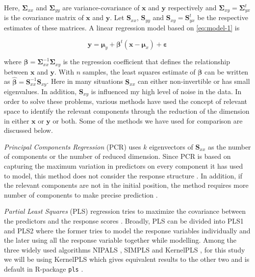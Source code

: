 \documentclass[12pt,3p,authoryear]{elsarticle}
\begin{document}
Here, \(\boldsymbol{\Sigma}_{xx}\) and \(\boldsymbol{\Sigma}_{yy}\) are variance-covariance of \(\mathbf{x}\) and \(\mathbf{y}\) respectively and \(\boldsymbol{\Sigma}_{xy}=\boldsymbol{\Sigma}_{yx}^t\) is the covariance matrix of \(\mathbf{x}\) and \(\mathbf{y}\). Let \(\mathbf{S}_{xx}\), \(\mathbf{S}_{yy}\) and \(\mathbf{S}_{xy}=\mathbf{S}_{yx}^t\) be the respective estimates of these matrices. A linear regression model based on \eqref{eq:model-1} is

\begin{equation}
\mathbf{y} = \boldsymbol{\mu}_y + \boldsymbol{\beta}^t\left( \mathbf{x} - \boldsymbol{\mu}_{x} \right) + \boldsymbol{\varepsilon}
\label{eq:reg-model}
\end{equation}

where \(\boldsymbol{\beta}=\boldsymbol{\Sigma}_{xx}^{-1}\boldsymbol{\Sigma}_{xy}\)
is the regression coefficient that defines the relationship between \(\mathbf{x}\)
and \(\mathbf{y}\). With \(n\) samples, the least squares estimate of \(\boldsymbol{\beta}\) can be written as \(\boldsymbol{\hat{\beta}}=\mathbf{S}_{xx}^{-1}\mathbf{S}_{xy}\). Here in many situations \(\mathbf{S}_{xx}\) can either non-invertible or has small eigenvalues. In addition, \(\mathbf{S}_{xy}\) is influenced my high level of noise in the data. In order to solve these problems, various methods have used the concept of relevant space to identify the relevant components through the reduction of the dimension in either \(\mathbf{x}\) or \(\mathbf{y}\) or both. Some of the methods we have used for comparison are discussed below.

\emph{Principal Components Regression} (PCR) uses \(k\) eigenvectors of \(\mathbf{S}_{xx}\) as the number of components or the number of reduced dimension. Since PCR is based on capturing the maximum variation in predictors on every component it has used to model, this method does not consider the response structure \citep{Jolliffe2002}. In addition, if the relevant components are not in the initial position, the method requires more number of components to make precise prediction \citep{Alm_y_1996}.

\emph{Partial Least Squares} (PLS) regression tries to maximize the covariance between the predictors and the response scores \citep{DeJong1993}. Broadly, PLS can be divided into PLS1 and PLS2 where the former tries to model the response variables individually and the later using all the response variable together while modelling. Among the three widely used algorithms NIPALS \citep{wold75nipals}, SIMPLS \citep{DeJong1993} and KernelPLS \citep{Lindgren_1993}, for this study we will be using KernelPLS which gives equivalent results to the other two and is default in R-package \texttt{pls} \citep{mevik07_thepl}.
\end{document}
